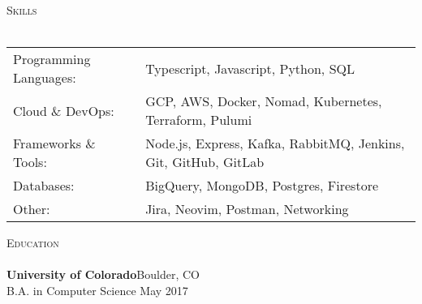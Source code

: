 \documentclass[a4paper]{article}
\newcommand{\lineunder} {
    \vspace*{-8pt} \\
    \hspace*{-18pt} \hrulefill \\
}
\newcommand{\header} [1] {
    {\hspace*{-18pt}\vspace*{6pt} \textsc{#1}}
    \vspace*{-6pt} \lineunder
}
\begin{document}
\header{Skills}
\begin{tabular}{ l l }
	Programming Languages: & Typescript, Javascript, Python, SQL                             \\
  Cloud \& DevOps:       & GCP, AWS, Docker, Nomad, Kubernetes, Terraform, Pulumi          \\
  Frameworks \& Tools:   & Node.js, Express, Kafka, RabbitMQ, Jenkins, Git, GitHub, GitLab \\
	Databases:             & BigQuery, MongoDB, Postgres, Firestore                          \\
	Other:                 & Jira, Neovim, Postman, Networking                               \\
\end{tabular}
\vspace{2mm}


%

\header{Education}
\textbf{University of Colorado}\hfill Boulder, CO\\
B.A. in Computer Science  \hfill May 2017\\
\vspace{2mm}



%
%
%


\
\end{document}
